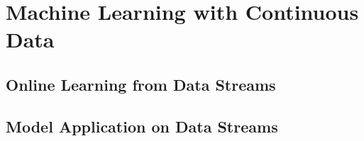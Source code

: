 \section{\label{sec:machineLearning}Machine Learning with Continuous Data}


\subsection{Online Learning from Data Streams}

\subsection{Model Application on Data Streams}